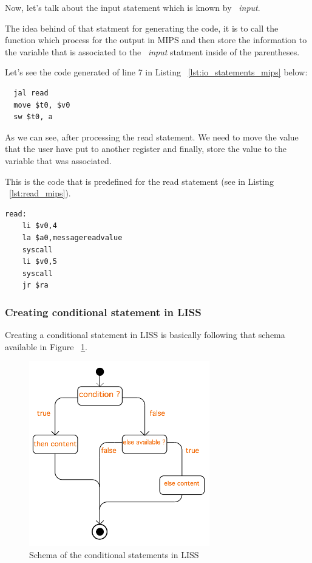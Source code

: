 \documentclass[
  oneside,
  11pt, a4paper,
  footinclude=true,
  headinclude=true,
  cleardoublepage=empty
]{scrbook}
\begin{document}
Now, let's talk about the input statement which is known by ~\textit{input}.

The idea behind of that statment for generating the code, it is to call the function which process for the output in MIPS and then store the information to the variable that is associated to the ~\textit{input} statment inside of the parentheses.

Let's see the code generated of line 7 in Listing ~\ref{lst:io_statements_mips} below:

\begin{lstlisting}
  jal read		
  move $t0, $v0		
  sw $t0, a		
\end{lstlisting}

As we can see, after processing the read statement. We need to move the value that the user have put to another register and finally, store the value to the variable that was associated.

This is the code that is predefined for the read statement (see in Listing ~\ref{lst:read_mips}).

\begin{lstlisting}[caption={Read statement code in MIPS},label={lst:read_mips}]
  read: 
    li $v0,4
    la $a0,messagereadvalue
    syscall
    li $v0,5
    syscall
    jr $ra
\end{lstlisting}

\subsubsection{Creating conditional statement in LISS}

Creating a conditional statement in LISS is basically following that schema available in Figure ~\ref{fig:conditional_figure}.

\begin{figure}[h!]
  \centering
    \includegraphics[width=0.7\textwidth]{img/conditional_statement.png}
    \caption{Schema of the conditional statements in LISS}
    \label{fig:conditional_figure}
\end{figure}
\end{document}
